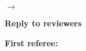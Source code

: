\documentclass[10pt,a4paper,sans]{moderncv}        %
\begin{document}
\medskip

$\rightarrow$ 


\bigskip

\textbf{Reply to reviewers}


\medskip


\textbf{First referee:}

\medskip



\end{document}
